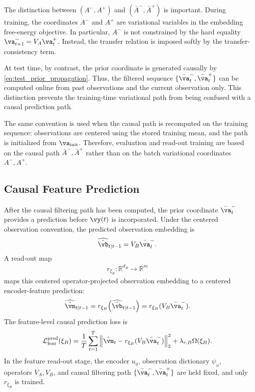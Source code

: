 \documentclass[twoside,11pt]{article}
\begin{document}
The distinction between $(A^-,A^+)$ and
$(\bar A^-,\bar A^+)$ is important. During training, the coordinates
$A^-$ and $A^+$ are variational variables in the embedding free-energy
objective. In particular, $A^-$ is not constrained by the hard equality
$\va_{t+1}^-=V_A\va_t^+$. Instead, the transfer relation is imposed
softly by the transfer-consistency term.

At test time, by contrast, the prior coordinate is generated causally by
\eqref{eq:test_prior_propagation}. Thus, the filtered sequence
$\{\bar{\va}_t^-,\bar{\va}_t^+\}$ can be computed online from past
observations and the current observation only. This distinction prevents
the training-time variational path from being confused with a causal
prediction path.

The same convention is used when the causal path is recomputed on the
training sequence: observations are centered using the stored training
mean, and the path is initialized from $\va_{\mathrm{init}}$. Therefore,
evaluation and read-out training are based on the causal path
$\bar A^-,\bar A^+$ rather than on the batch variational coordinates
$A^-,A^+$.

\subsection{Causal Feature Prediction}

After the causal filtering path has been computed, the prior coordinate
$\bar{\va}_t^-$ provides a prediction before $\vy(t)$ is incorporated.
Under the centered observation convention, the predicted observation
embedding is
\begin{align}
\widehat{\tilde{\vb}}_{t|t-1}
=
V_B\bar{\va}_t^-.
\label{eq:predicted_observation_embedding_prior}
\end{align}
A read-out map
\begin{align}
r_{\xi_B}:\mathbb R^{d_B}\to\mathbb R^m
\label{eq:readout_map_definition}
\end{align}
maps this centered operator-projected observation embedding to a
centered encoder-feature prediction:
\begin{align}
\widehat{\tilde{\vm}}_{t|t-1}
=
r_{\xi_B}\!\left(\widehat{\tilde{\vb}}_{t|t-1}\right)
=
r_{\xi_B}(V_B\bar{\va}_t^-).
\label{eq:predicted_centered_encoder_feature}
\end{align}
The feature-level causal prediction loss is
\begin{align}
\mathcal L_{\mathrm{feat}}^{\mathrm{pred}}(\xi_B)
=
\frac1T
\sum_{t=1}^T
\left\|
\tilde{\vm}_t
-
r_{\xi_B}(V_B\bar{\va}_t^-)
\right\|_2^2
+
\lambda_{r,B}\Omega(\xi_B).
\label{eq:feature_prediction_loss}
\end{align}
In the feature read-out stage, the encoder $u_\eta$, observation
dictionary $\psi_\omega$, operators $V_A,V_B$, and causal filtering path
$\{\bar{\va}_t^-,\bar{\va}_t^+\}$ are held fixed, and only
$r_{\xi_B}$ is trained.
\end{document}
